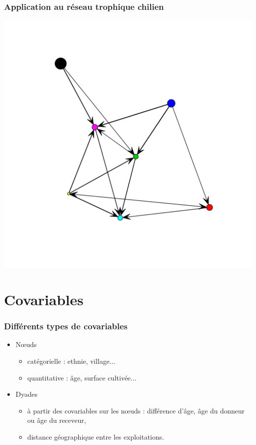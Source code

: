 \documentclass[nopagenumber,9pt]{beamer}
\begin{document}
\begin{frame}
 \frametitle{Application au réseau trophique chilien }
 
 \begin{center}
  \includegraphics[scale=.3]{plots/chilean_sbm_sum.pdf}
 \end{center}

 
 
\end{frame}



\section{Covariables}


\begin{frame}
 \frametitle{Différents types de covariables}
 
 
 \begin{itemize}
  \item N\oe uds
  
  \begin{itemize}
   \item catégorielle : ethnie, village...
   \item quantitative : \^age, surface cultivée...
  \end{itemize}

  \medskip
  
  \item Dyades
  
  \begin{itemize}
   \item à partir des covariables sur les n\oe uds : différence d'\^age, \^age du donneur ou \^age du receveur,
   \item distance géographique entre les exploitations.
  \end{itemize}

  
  
 \end{itemize}

 \end{frame}
\end{document}
